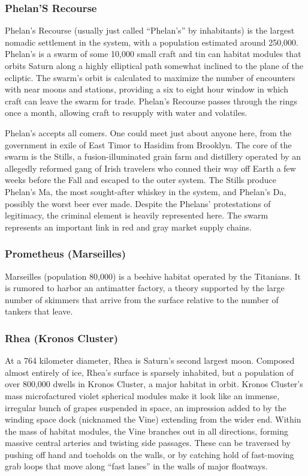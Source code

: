 \subsubsection{Phelan'S Recourse}

Phelan's Recourse (usually just called ``Phelan's'' by 
inhabitants) is the largest nomadic settlement in the 
system, with a population estimated around 250,000. 
Phelan's is a swarm of some 10,000 small craft and tin 
can habitat modules that orbits Saturn along a highly 
elliptical path somewhat inclined to the plane of the 
ecliptic. The swarm's orbit is calculated to maximize 
the number of encounters with near moons and stations, providing a six to eight hour window in which 
craft can leave the swarm for trade. Phelan's Recourse 
passes through the rings once a month, allowing craft 
to resupply with water and volatiles.

Phelan's accepts all comers. One could meet just 
about anyone here, from the government in exile of 
East Timor to Hasidim from Brooklyn. The core of 
the swarm is the Stills, a fusion-illuminated grain 
farm and distillery operated by an allegedly reformed 
gang of Irish travelers who conned their way off 
Earth a few weeks before the Fall and escaped to 
the outer system. The Stills produce Phelan's Ma, the 
most sought-after whiskey in the system, and Phelan's 
Da, possibly the worst beer ever made. Despite the 
Phelans' protestations of legitimacy, the criminal 
element is heavily represented here. The swarm 
represents an important link in red and gray market 
supply chains.

\subsubsection{Prometheus (Marseilles)}

Marseilles (population 80,000) is a beehive habitat 
operated by the Titanians. It is rumored to harbor an 
antimatter factory, a theory supported by the large 
number of skimmers that arrive from the surface relative to the number of tankers that leave.

\subsubsection{Rhea (Kronos Cluster)}

At a 764 kilometer diameter, Rhea is Saturn's second 
largest moon. Composed almost entirely of ice, Rhea's 
surface is sparsely inhabited, but a population of over 
800,000 dwells in Kronos Cluster, a major habitat 
in orbit. Kronos Cluster's mass microfactured violet 
spherical modules make it look like an immense, irregular bunch of grapes suspended in space, an impression added to by the winding space dock (nicknamed 
the Vine) extending from the wider end. Within the 
mass of habitat modules, the Vine branches out in all 
directions, forming massive central arteries and twisting side passages. These can be traversed by pushing 
off hand and toeholds on the walls, or by catching 
hold of fast-moving grab loops that move along ``fast 
lanes'' in the walls of major floatways.

